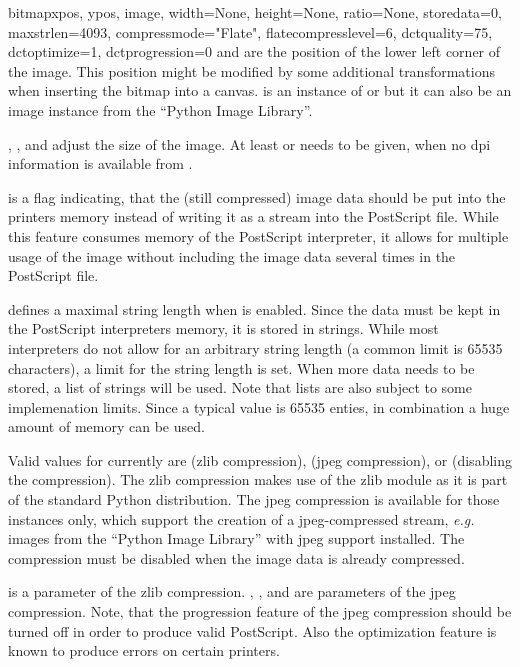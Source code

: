\begin{classdesc}{bitmap}{xpos, ypos, image, width=None, height=None,
  ratio=None, storedata=0, maxstrlen=4093, compressmode="Flate",
  flatecompresslevel=6, dctquality=75, dctoptimize=1,
  dctprogression=0}
   and  are the position of the lower left corner
  of the image. This position might be modified by some additional
  transformations when inserting the bitmap into a canvas. 
  is an instance of  or  but it can also
  be an image instance from the ``Python Image Library''.

  , , and  adjust the size of the
  image. At least  or  needs to be given, when
  no dpi information is available from .

   is a flag indicating, that the (still compressed)
  image data should be put into the printers memory instead of writing
  it as a stream into the PostScript file. While this feature consumes
  memory of the PostScript interpreter, it allows for multiple usage
  of the image without including the image data several times in the
  PostScript file.

   defines a maximal string length when 
  is enabled. Since the data must be kept in the PostScript
  interpreters memory, it is stored in strings. While most
  interpreters do not allow for an arbitrary string length (a common
  limit is 65535 characters), a limit for the string length is set.
  When more data needs to be stored, a list of strings will be used.
  Note that lists are also subject to some implemenation limits. Since
  a typical value is 65535 enties, in combination a huge amount of
  memory can be used.

  Valid values for  currently are
   (zlib compression),
   (jpeg compression), or
   (disabling the compression). The zlib compression makes
  use of the zlib module as it is part of the standard Python
  distribution. The jpeg compression is available for those
   instances only, which support the creation of a
  jpeg-compressed stream, \emph{e.g.} images from the ``Python Image
  Library'' with jpeg support installed. The compression must be
  disabled when the image data is already compressed.

   is a parameter of the zlib compression.
  , , and  are
  parameters of the jpeg compression. Note, that the progression
  feature of the jpeg compression should be turned off in order to
  produce valid PostScript. Also the optimization feature is known to
  produce errors on certain printers.
\end{classdesc}

